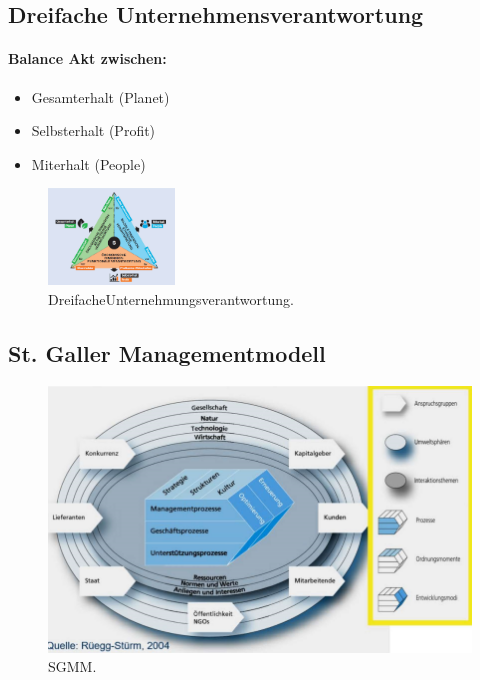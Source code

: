 \documentclass{article}
\begin{document}
\subsection{Dreifache Unternehmensverantwortung}
\paragraph{Balance Akt zwischen:} 

\begin{itemize}
\item Gesamterhalt (Planet)
\item Selbsterhalt (Profit)
\item Miterhalt (People)
\end{itemize}

\begin{figure}[H]
\centering
\includegraphics[width=0.3\textwidth]{Resources/Image/Dreifache Unternehmungsveratntwortung.png}
\caption{\label{fig:DreifacheUnternehmungsverantwortung}DreifacheUnternehmungsverantwortung.}
\end{figure}


\subsection{St. Galler Managementmodell}
\begin{figure}[H]
\centering
\includegraphics [width=50\textwidth]{Resources/Image/SGMM.png}
\caption{\label{fig:SGMM}SGMM.}
\end{figure}
\end{document}
